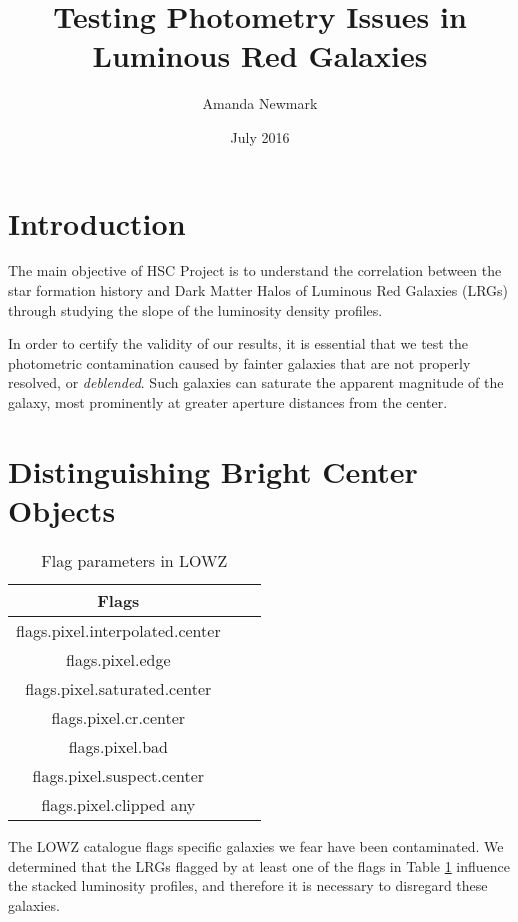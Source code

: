 \documentclass{article}
\title{Testing Photometry Issues in Luminous Red Galaxies}
\author{Amanda Newmark}
\date{July 2016}
\begin{document}
\begin{titlepage}
\maketitle
\end{titlepage}
\tableofcontents{}
\section{Introduction}

The main objective of HSC Project is to understand the correlation between the star formation history and Dark Matter Halos of Luminous Red Galaxies (LRGs) through studying the slope of the luminosity density profiles.

In order to certify the validity of our results, it is essential that we test the photometric contamination caused by fainter galaxies that are not properly resolved, or \textit{deblended}. Such galaxies can saturate the apparent magnitude of the galaxy, most prominently at greater aperture distances from the center.

\section{Distinguishing Bright Center Objects}

\begin{table}[h]
\centering
\begin{tabular}{||ccc||}
\hline
Flags  \\ 
\hline\hline
flags.pixel.interpolated.center  \\[1ex]
\hline
flags.pixel.edge \\
\hline
flags.pixel.saturated.center \\[1ex]
\hline
flags.pixel.cr.center \\
\hline
flags.pixel.bad \\
\hline 
flags.pixel.suspect.center \\[1ex]
\hline
flags.pixel.clipped any \\ [1ex]
\hline
\end{tabular}
\caption{Flag parameters in LOWZ}
\label{table:1}
\end{table}

The LOWZ catalogue flags specific galaxies we fear have been contaminated. We determined that the LRGs flagged by at least one of the flags in Table \ref{table:1} influence the stacked luminosity profiles, and therefore it is necessary to disregard these galaxies. 
\end{document}
